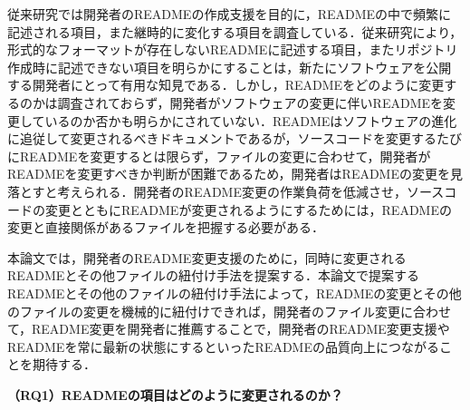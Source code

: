 \documentclass[submit]{ipsj}
\begin{document}
従来研究\cite{prana_README}\cite{Ikeda_README}\cite{Kamei_README}では開発者のREADMEの作成支援を目的に，READMEの中で頻繁に記述される項目，また継時的に変化する項目を調査している．従来研究により，形式的なフォーマットが存在しないREADMEに記述する項目，またリポジトリ作成時に記述できない項目を明らかにすることは，新たにソフトウェアを公開する開発者にとって有用な知見である．しかし，READMEをどのように変更するのかは調査されておらず，開発者がソフトウェアの変更に伴いREADMEを変更しているのか否かも明らかにされていない．READMEはソフトウェアの進化に追従して変更されるべきドキュメントであるが，ソースコードを変更するたびにREADMEを変更するとは限らず，ファイルの変更に合わせて，開発者がREADMEを変更すべきか判断が困難であるため，開発者はREADMEの変更を見落とすと考えられる．開発者のREADME変更の作業負荷を低減させ，ソースコードの変更とともにREADMEが変更されるようにするためには，READMEの変更と直接関係があるファイルを把握する必要がある．



本論文では，開発者のREADME変更支援のために，同時に変更されるREADMEとその他ファイルの紐付け手法を提案する．本論文で提案するREADMEとその他のファイルの紐付け手法によって，READMEの変更とその他のファイルの変更を機械的に紐付けできれば，開発者のファイル変更に合わせて，README変更を開発者に推薦することで，開発者のREADME変更支援やREADMEを常に最新の状態にするといったREADMEの品質向上につながることを期待する．






\noindent\textbf{（RQ1）READMEの項目はどのように変更されるのか？}
\end{document}
